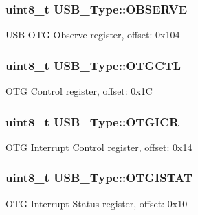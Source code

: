 \subsubsection[{\texorpdfstring{O\+B\+S\+E\+R\+VE}{OBSERVE}}]{ uint8\+\_\+t U\+S\+B\+\_\+\+Type\+::\+O\+B\+S\+E\+R\+VE}\hypertarget{structUSB__Type_aa8cbc53b1ddc255d7be917ba3fc6b1f1}{}\label{structUSB__Type_aa8cbc53b1ddc255d7be917ba3fc6b1f1}
U\+SB O\+TG Observe register, offset\+: 0x104 
\subsubsection[{\texorpdfstring{O\+T\+G\+C\+TL}{OTGCTL}}]{ uint8\+\_\+t U\+S\+B\+\_\+\+Type\+::\+O\+T\+G\+C\+TL}\hypertarget{structUSB__Type_a29fdcad4635573158769b379244874c6}{}\label{structUSB__Type_a29fdcad4635573158769b379244874c6}
O\+TG Control register, offset\+: 0x1C 
\subsubsection[{\texorpdfstring{O\+T\+G\+I\+CR}{OTGICR}}]{ uint8\+\_\+t U\+S\+B\+\_\+\+Type\+::\+O\+T\+G\+I\+CR}\hypertarget{structUSB__Type_ac63531ec3a52f634997a5f27a938232e}{}\label{structUSB__Type_ac63531ec3a52f634997a5f27a938232e}
O\+TG Interrupt Control register, offset\+: 0x14 
\subsubsection[{\texorpdfstring{O\+T\+G\+I\+S\+T\+AT}{OTGISTAT}}]{ uint8\+\_\+t U\+S\+B\+\_\+\+Type\+::\+O\+T\+G\+I\+S\+T\+AT}\hypertarget{structUSB__Type_a33ddb4989093727ebbeaabdcbb30a9be}{}\label{structUSB__Type_a33ddb4989093727ebbeaabdcbb30a9be}
O\+TG Interrupt Status register, offset\+: 0x10 
